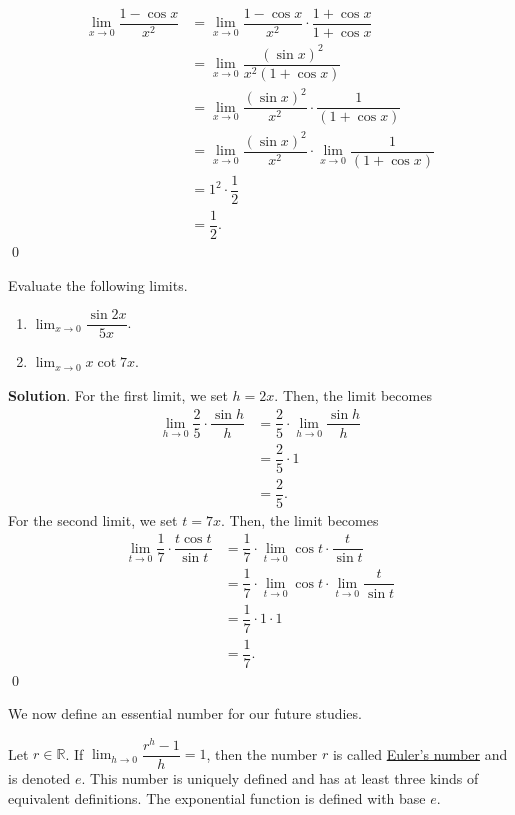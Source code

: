 \documentclass[11pt]{book}
\theoremstyle{break}
\theoremstyle{no_label}
\newcommand{\bbR}{\mathbb{R}}
\numberwithin{equation}{section}
\begin{document}
\begin{align*}
    \lim_{x\to 0}\dfrac{1-\cos x}{x^2}&=\lim_{x\to 0}\dfrac{1-\cos x}{x^2}\cdot\dfrac{1+\cos x}{1+\cos x}\\
    &=\lim_{x\to 0}\dfrac{(\sin x)^2}{x^2(1+\cos x)}\\
    &=\lim_{x\to 0}\dfrac{(\sin x)^2}{x^2}\cdot\dfrac{1}{(1+\cos x)}\\
    &=\lim_{x\to 0}\dfrac{(\sin x)^2}{x^2}\cdot\lim_{x\to 0}\dfrac{1}{(1+\cos x)}\\
    &=1^2\cdot\dfrac{1}{2}\\
    &=\dfrac{1}{2}.
\end{align*} \qed

\begin{example}
    Evaluate the following limits.
    \begin{enumerate}
        \item $\displaystyle\lim_{x\to 0}\dfrac{\sin 2x}{5x}$.
        \item $\displaystyle\lim_{x\to 0}x\cot7x$.
    \end{enumerate}
\end{example}
\textbf{Solution}. For the first limit, we set $h=2x$. Then, the limit becomes \begin{align*}
    \lim_{h\to 0}\dfrac{2}{5}\cdot\dfrac{\sin h}{h}&=\dfrac{2}{5}\cdot\lim_{h\to 0}\dfrac{\sin h}{h}\\
    &=\dfrac{2}{5}\cdot1\\
    &=\dfrac{2}{5}.
\end{align*} For the second limit, we set $t=7x$. Then, the limit becomes \begin{align*}
    \lim_{t\to 0}\dfrac{1}{7}\cdot\dfrac{t\cos t}{\sin t}&=\dfrac{1}{7}\cdot\lim_{t\to 0}\cos t\cdot\dfrac{t}{\sin t}\\
    &=\dfrac{1}{7}\cdot\lim_{t\to 0}\cos t\cdot\lim_{t\to 0}\dfrac{t}{\sin t}\\
    &=\dfrac{1}{7}\cdot1\cdot1\\
    &=\dfrac{1}{7}.
\end{align*} \qed

We now define an essential number for our future studies.

\begin{definition}
    Let $r\in\bbR$. If $\displaystyle\lim_{h\to 0}\dfrac{r^h-1}{h}=1$, then the number $r$ is called \underline{Euler's number} and is denoted $e$. This number is uniquely defined and has at least three kinds of equivalent definitions. The exponential function is defined with base $e$.
\end{definition}
\end{document}
